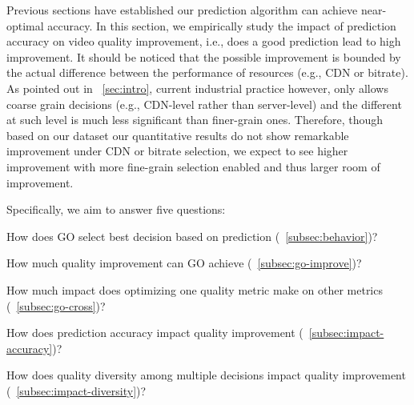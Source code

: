 \label{sec:improvement}

Previous sections have established our prediction algorithm can achieve near-optimal accuracy. In this section, we empirically study the impact of prediction accuracy on video quality improvement, i.e., does a good prediction lead to high improvement. It should be noticed that the possible improvement is bounded by the actual difference between the performance of resources (e.g., CDN or bitrate). As pointed out in \Section~\ref{sec:intro}, current industrial practice however, only allows coarse grain decisions (e.g., CDN-level rather than server-level) and the different at such level is much less significant than finer-grain ones. Therefore, though based on our dataset our quantitative results do not show remarkable improvement under CDN or bitrate selection, we expect to see higher improvement with more fine-grain selection enabled and thus larger room of improvement.

Specifically, we aim to answer five questions:
\begin{packedenumerate}
	\item How does GO select best decision based on prediction (\Section~\ref{subsec:behavior})?
	\item How much quality improvement can GO achieve (\Section~\ref{subsec:go-improve})?
	\item How much impact does optimizing one quality metric make on other metrics (\Section~\ref{subsec:go-cross})?
	\item How does prediction accuracy impact quality improvement (\Section~\ref{subsec:impact-accuracy})?
	\item How does quality diversity among multiple decisions impact quality improvement  (\Section~\ref{subsec:impact-diversity})?
\end{packedenumerate}

